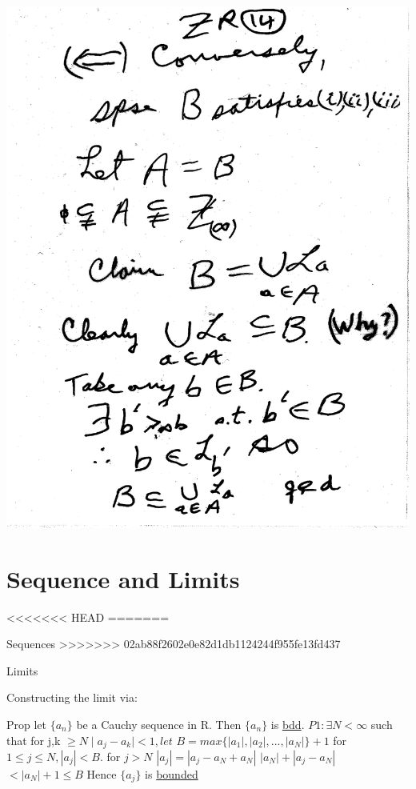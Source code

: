 \documentclass[10pt,a4paper]{article}
\begin{document}
{{\begin{enumerate}[(ii)]
\includegraphics[scale=.5]{Pages/ZR_14}

\end{enumerate}

\section{Sequence and Limits}

<<<<<<< HEAD
=======

Sequences
>>>>>>> 02ab88f2602e0e82d1db1124244f955fe13fd437

Limits

Constructing the limit via:


Prop let $\{a_n\}$ be a Cauchy sequence in R. Then $\{a_n\}$ is \underline{bdd}.
$P1:\exists N <\infty$ such that for j,k $\geq N \mid a_j - a_k \mid < 1,let$
$B= max \{|a_1|, |a_2|,..., |a_N|\}+1$
for $ 1 \leq j \leq N, |a_j|< B.$
for $ j>N $
$|a_j| = |a_j-a_N+a_N|$
$|a_N| + |a_j-a_N|$
$<|a_N| + 1 \leq B$
Hence $\{a_j\}$ is \underline{bounded}

}}
\end{document}

